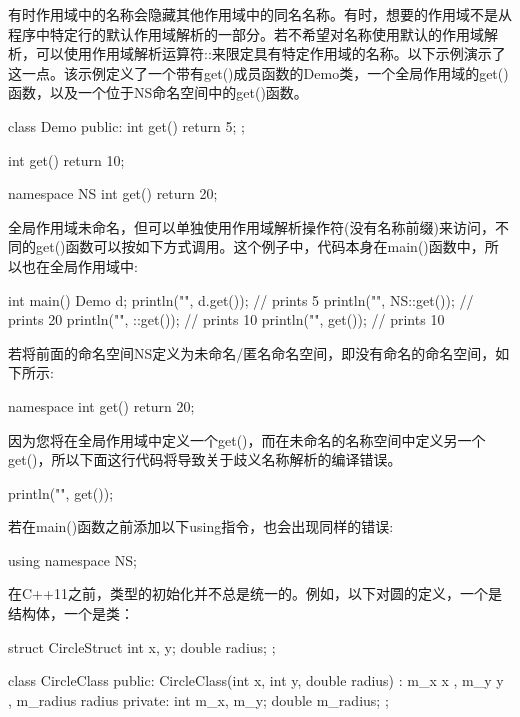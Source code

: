 有时作用域中的名称会隐藏其他作用域中的同名名称。有时，想要的作用域不是从程序中特定行的默认作用域解析的一部分。若不希望对名称使用默认的作用域解析，可以使用作用域解析运算符::来限定具有特定作用域的名称。以下示例演示了这一点。该示例定义了一个带有get()成员函数的Demo类，一个全局作用域的get()函数，以及一个位于NS命名空间中的get()函数。

\begin{cpp}
class Demo
{
    public:
    int get() { return 5; }
};

int get() { return 10; }

namespace NS
{
    int get() { return 20; }
}
\end{cpp}

全局作用域未命名，但可以单独使用作用域解析操作符(没有名称前缀)来访问，不同的get()函数可以按如下方式调用。这个例子中，代码本身在main()函数中，所以也在全局作用域中:

\begin{cpp}
int main()
{
    Demo d;
    println("{}", d.get()); // prints 5
    println("{}", NS::get()); // prints 20
    println("{}", ::get()); // prints 10
    println("{}", get()); // prints 10
}
\end{cpp}

若将前面的命名空间NS定义为未命名/匿名命名空间，即没有命名的命名空间，如下所示:

\begin{cpp}
namespace
{
    int get() { return 20; }
}
\end{cpp}

因为您将在全局作用域中定义一个get()，而在未命名的名称空间中定义另一个get()，所以下面这行代码将导致关于歧义名称解析的编译错误。

\begin{cpp}
println("{}", get());
\end{cpp}

若在main()函数之前添加以下using指令，也会出现同样的错误:

\begin{cpp}
using namespace NS;
\end{cpp}


在C++11之前，类型的初始化并不总是统一的。例如，以下对圆的定义，一个是结构体，一个是类：

\begin{cpp}
struct CircleStruct
{
    int x, y;
    double radius;
};

class CircleClass
{
    public:
        CircleClass(int x, int y, double radius)
            : m_x { x }, m_y { y }, m_radius { radius } {}
    private:
        int m_x, m_y;
        double m_radius;
};
\end{cpp}

